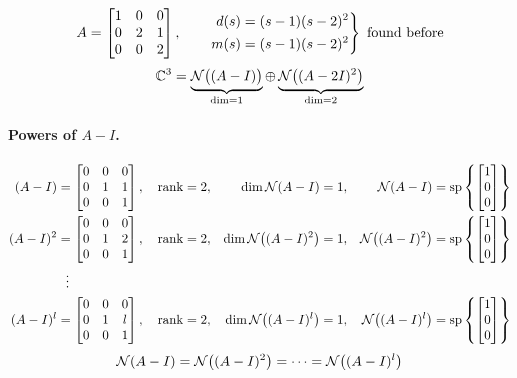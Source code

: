 \begin{example}
\[
A=\begin{bmatrix}1&0&0\\0&2&1\\0&0&2\end{bmatrix},\qquad
\left.\begin{aligned}d(s)&=(s-1)(s-2)^2\\ m(s)&=(s-1)(s-2)^2\end{aligned}\right\}\ \text{found before}
\]
\[
\mathbb{C}^3=\underbrace{\mathcal{N}\big((A-I)\big)}_{\dim=1}\oplus\underbrace{\mathcal{N}\big((A-2I)^2\big)}_{\dim=2}
\]
\paragraph{Powers of $A-I$.}
\begin{align*}
(A-I)&=\begin{bmatrix}0&0&0\\0&1&1\\0&0&1\end{bmatrix}, \quad \operatorname{rank}=2, & \dim\mathcal{N}(A-I)&=1, & \mathcal{N}(A-I)&=\operatorname{sp}\left\{\begin{bmatrix}1\\0\\0\end{bmatrix}\right\}\\
(A-I)^2&=\begin{bmatrix}0&0&0\\0&1&2\\0&0&1\end{bmatrix}, \quad \operatorname{rank}=2, & \dim\mathcal{N}\big((A-I)^2\big)&=1, & \mathcal{N}\big((A-I)^2\big)&=\operatorname{sp}\left\{\begin{bmatrix}1\\0\\0\end{bmatrix}\right\}\\
&\ \ \vdots\\
(A-I)^l&=\begin{bmatrix}0&0&0\\0&1&l\\0&0&1\end{bmatrix}, \quad \operatorname{rank}=2, & \dim\mathcal{N}\big((A-I)^l\big)&=1, & \mathcal{N}\big((A-I)^l\big)&=\operatorname{sp}\left\{\begin{bmatrix}1\\0\\0\end{bmatrix}\right\}
\end{align*}
\[
\mathcal{N}(A-I)=\mathcal{N}\big((A-I)^2\big)=\dots=\mathcal{N}\big((A-I)^l\big)
\]


\end{example}
